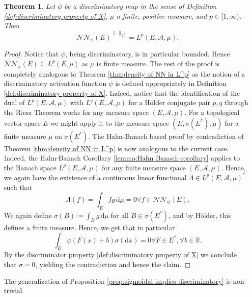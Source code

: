 \documentclass[11pt,a4paper,twoside,openany]{report}
\numberwithin{equation}{section}
\newcommand{\diff}{\mathrm{d}}
\theoremstyle{plain} %
\newtheorem{theorem}{Theorem}[section]
\theoremstyle{definition} %
\theoremstyle{remark} %
\begin{document}
\begin{theorem}\label{thm:density of NN in L^p on topological vector space}
    Let \(\psi\) be a discriminatory map in the sense of Definition \ref{def:discriminatory property of X}, \(\mu\) a finite, positive measure, and \(p\in[1,\infty)\). Then
    \begin{equation*}
         \overline{\mathcal{NN}_{\psi}(E)}^{\lVert\cdot\rVert_{L^p}}=L^p(E,\mathcal{A},\mu).
    \end{equation*}
\end{theorem} 
\begin{proof}
    Notice that \(\psi\), being discriminatory, is in particular bounded. Hence \(\mathcal{NN}_{\psi}(E)\subseteq L^p(E,\mu)\) as \(\mu\) is finite measure. The rest of the proof is completely analogous to Theorem \ref{thm:density of NN in L^p} as the notion of a discriminatory activation function \(\psi\) is defined appropriately in Definition \ref{def:discriminatory property of X}. Indeed, notice that the identification of the dual of \(L^p(E,\mathcal{A},\mu)\) with \(L^q(E,\mathcal{A},\mu)\) for a Hölder conjugate pair \(p,q\) through the Riesz Theorem works for any measure space \((E,\mathcal{A},\mu)\). For a topological vector space \(E\) we might apply it to the measure space \((E,\sigma(E^*),\mu)\) for a finite measure \(\mu\) on \(\sigma(E^*)\). The Hahn-Banach based proof by contradiction of Theorem \ref{thm:density of NN in L^p}  is now analogous to the current case. Indeed, the Hahn-Banach Corollary \ref{lemma:Hahn Banach corollary} applies to the Banach space \(L^p(E,\mathcal{A},\mu)\) for any finite measure space \((E,\mathcal{A},\mu)\). Hence, we again have the existence of a continuous linear functional \(\Lambda\in L^p(E,\mathcal{A},\mu)^*\) such that 
    \begin{equation*}
        \Lambda(f)=\int_{E}fg\,\diff \mu=0\forall f\in \mathcal{NN}_{\psi}(E).
    \end{equation*}
    We again define \(\sigma(B)\coloneqq\int_B g\,\diff \mu\) for all \(B\in\sigma(E^*)\), and by Hölder, this defines a finite measure. Hence, we get that in particular 
     \begin{equation*}
        \int_{E}\psi(F(x)+b) \sigma(\diff x)=0\forall F\in E^*,\forall b\in\mathbb{R}.
\end{equation*}
    By the discriminator property \ref{def:discriminatory property of X} we conclude that \(\sigma=0\), yielding the contradiction and hence the claim. 
\end{proof}
The generalization of Proposition \ref{prop:sigmoidal implies discriminatory} is non-trivial. 
\end{document}

